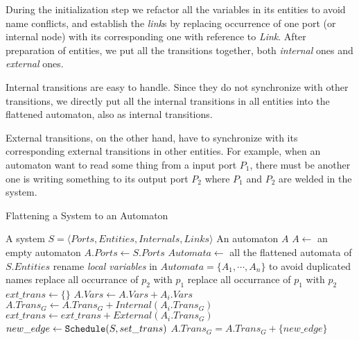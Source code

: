 During the initialization step we refactor all the variables in its entities to avoid name conflicts, and establish the \emph{link}s by replacing occurrence of one port (or internal node) with its corresponding one with reference to \emph{Link}.
After preparation of entities, we put all the transitions together, both \emph{internal} ones and \emph{external} ones.

Internal transitions are easy to handle. Since they do not synchronize with other transitions, we directly put all the internal transitions in all entities into the flattened automaton, also as internal transitions.

External transitions, on the other hand, have to synchronize with its corresponding external transitions in other entities. For example, when an automaton want to read some thing from a input port $P_1$, there must be another one is writing something to its output port $P_2$ where $P_1$ and $P_2$ are welded in the system.

\begin{algorithm}[H]
    \caption{Flattening a System to an Automaton}
    \label{alg:compose}
    \begin{algorithmic}[1]
        \REQUIRE A system $S=\langle Ports, Entities, Internals, Links\rangle$
        \ENSURE An automaton $A$
        \STATE $A \leftarrow $ an empty automaton
        \STATE $A.Ports\leftarrow S.Ports$
        \STATE $Automata\leftarrow$ all the flattened automata of $S.Entities$
        \STATE rename \emph{local variables} in $Automata=\{A_1,\cdots,A_n\}$ to avoid duplicated names
                \STATE replace all occurrance of $p_2$ with $p_1$
            \ELSE
                \STATE replace all occurrance of $p_1$ with $p_2$
            \ENDIF
        \ENDFOR
        \STATE $ext\_trans\leftarrow \{\}$
            \STATE $A.Vars\leftarrow A.Vars + A_i.Vars$
            \STATE $A.Trans_G \leftarrow A.Trans_G + Internal(A_i.Trans_G)$
            \STATE $ext\_trans \leftarrow ext\_trans + External(A_i.Trans_G)$
        \ENDFOR
            \STATE $new\_edge\leftarrow \mbox{\texttt{Schedule}}(S, set\_trans)$ 
                \STATE $A.Trans_G = A.Trans_G + \{new\_edge\}$
            \ENDIF
        \ENDFOR
    \end{algorithmic}
\end{algorithm}

